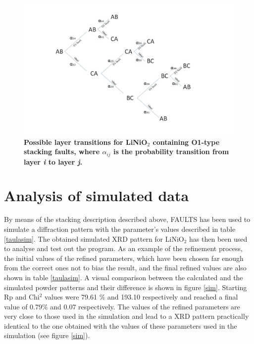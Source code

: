 \begin{figure}[t]
\begin{center}
\includegraphics [width=5.2 in]{transitions.jpg}
\caption{\bf Possible layer transitions for LiNiO$_2$ containing O1-type stacking faults, where $\alpha_{ij}$ is the probability transition from layer \emph{i} to layer \emph{j}.}
\label{capes}
\end{center}
\end{figure}





\section{Analysis of simulated data}
\label{Analysis of simulated data}

By  means of the  stacking description described above, FAULTS has been used to simulate a diffraction pattern with the parameter's values described in table \ref{taulasim}.
The obtained simulated XRD pattern for LiNiO$_{2}$ has then been used to analyse and test out the program. As an example of the refinement process, the initial values of the refined parameters, which have been chosen far enough from the correct ones not to bias the result,
and  the final refined values are also  shown in table \ref{taulasim}.
A visual comparison between the calculated and the simulated powder patterns and their difference is shown in figure \ref{sim}.
Starting Rp and Chi$^{2}$ values were 79.61 $\%$  and 193.10 respectively and reached a final value of 0.79$\%$ and 0.07 respectively.
The values of the refined parameters are very close to those used in the simulation and lead to a XRD pattern practically
identical to the one obtained with the values of these parameters used in the simulation (see figure \ref{sim}).



